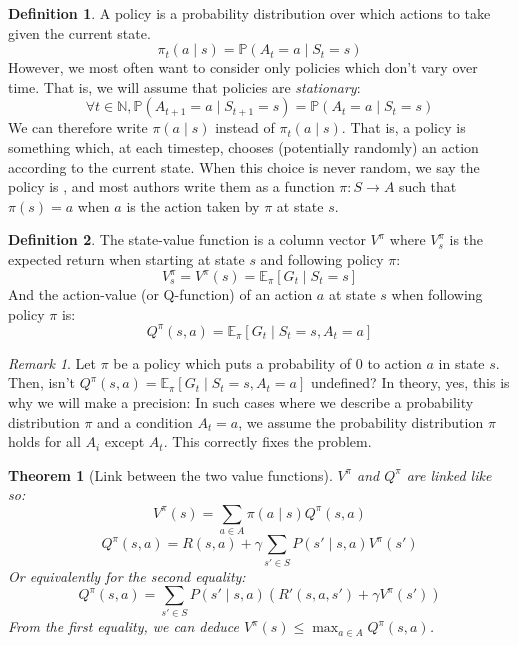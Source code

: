 \documentclass{article}
\newtheorem{theorem}{Theorem}[section]
\theoremstyle{definition}
\newtheorem{definition}{Definition}[section]
\theoremstyle{remark}
\newtheorem*{remark}{Remark}
\theoremstyle{example}
\begin{document}
\begin{definition}
		A policy is a probability distribution over which actions to take given the current state.
				$$\pi_t(a \mid s) = \mathbb{P}(A_t = a \mid S_t = s)$$
		However, we most often want to consider only policies which don't vary over time. That is, we will assume that policies are \textit{stationary}:
				$$\forall t \in \mathbb{N}, \mathbb{P}(A_{t+1} = a \mid S_{t+1} = s) = \mathbb{P}(A_t = a \mid S_t = s)$$
		We can therefore write $\pi(a \mid s)$ instead of $\pi_t(a \mid s)$. That is, a policy is something which, at each timestep, chooses (potentially randomly) an action according to the current state. When this choice is never random, we say the policy is , and most authors write them as a function $\pi : S \rightarrow A$ such that $\pi(s) = a$ when $a$ is the action taken by $\pi$ at state $s$.
\end{definition}

\begin{definition}
		The state-value function is a column vector $V^\pi$ where $V^\pi_s$ is the expected return when starting at state $s$ and following policy $\pi$:				$$V^\pi_s = V^\pi(s) = \mathbb{E}_\pi[G_t \mid S_t = s]$$
		And the action-value (or Q-function) of an action $a$ at state $s$ when following policy $\pi$ is:
				$$Q^\pi(s, a) = \mathbb{E}_\pi[G_t \mid S_t = s, A_t = a]$$
\end{definition}

\begin{remark}
		Let $\pi$ be a policy which puts a probability of 0 to action $a$ in state $s$. Then, isn't $Q^\pi(s, a) = \mathbb{E}_\pi[G_t \mid S_t = s, A_t = a]$ undefined? In theory, yes, this is why we will make a precision: In such cases where we describe a probability distribution $\pi$ and a condition $A_t = a$, we assume the probability distribution $\pi$ holds for all $A_i$ except $A_t$. This correctly fixes the problem.
\end{remark}

\begin{theorem}[Link between the two value functions] \label{thm:linkVQ}
		$V^\pi$ and $Q^\pi$ are linked like so:
				$$V^\pi(s) = \sum_{a \in A} \pi(a \mid s) Q^\pi(s, a)$$
				$$Q^\pi(s, a) = R(s, a) + \gamma \sum_{s' \in S} P(s' \mid s, a) V^\pi(s')$$
		Or equivalently for the second equality:
				$$Q^\pi(s, a) = \sum_{s' \in S} P(s' \mid s, a)(R'(s, a, s') + \gamma V^\pi(s'))$$
		From the first equality, we can deduce $V^\pi(s) \leq \max_{a \in A} Q^\pi(s, a)$.
\end{theorem}
\end{document}
